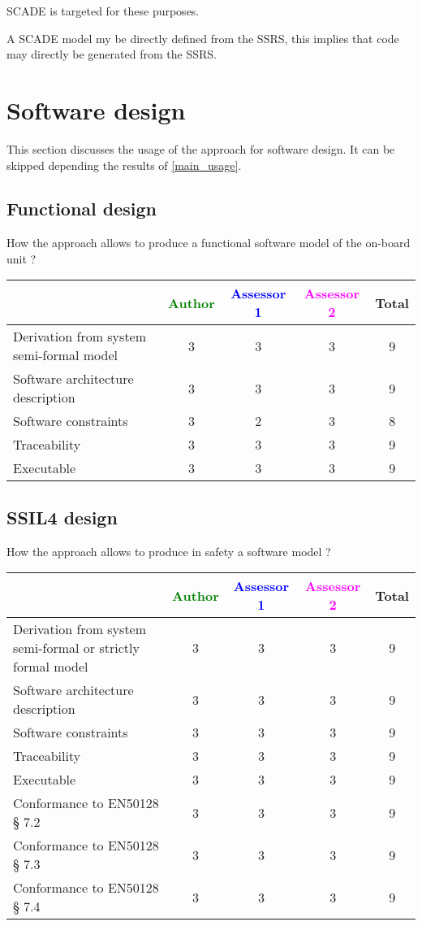\begin{author_comment}
SCADE is targeted for these purposes.   
\end{author_comment}
\begin{assessor2}
A SCADE model my be directly defined from the SSRS, this implies that
code may directly be generated from the SSRS.
\end{assessor2}


\section{Software design}
This section discusses the usage of the approach for software design.
It can be skipped depending the results of \ref{main_usage}.

\subsection{Functional design}

How the approach allows to  produce a functional software model of the on-board unit ?

\begin{tabular}{|l | c | c | c | c|}
\hline
& \textcolor{green}{Author} & \textcolor{blue}{Assessor 1} & \textcolor{magenta}{Assessor 2} & Total \\
\hline
Derivation from system semi-formal model  & 3 & 3 &3 & 9 \\
\hline 
Software architecture description  & 3 & 3 &3 & 9 \\
\hline
Software constraints  & 3 & 2 &3 & 8 \\
\hline
Traceability  & 3 & 3 &3 & 9 \\
\hline
Executable  & 3 & 3 &3 & 9 \\
\hline
\end{tabular}

\subsection{SSIL4 design}

How the approach allows to  produce in safety a software model ?

\begin{tabular}{|l | c | c | c | c|}
\hline
& \textcolor{green}{Author} & \textcolor{blue}{Assessor 1} & \textcolor{magenta}{Assessor 2} & Total \\
\hline
Derivation from system semi-formal or strictly formal model  &
3 & 3 &3 & 9 \\
\hline 
Software architecture description  & 3 & 3 &3 & 9 \\
\hline
Software constraints  & 3 & 3 &3 & 9 \\
\hline
Traceability  & 3 & 3 &3 & 9 \\
\hline
Executable  & 3 & 3 &3 & 9 \\
\hline
Conformance to EN50128 § 7.2  & 3 & 3 &3 & 9 \\
\hline
Conformance to EN50128 § 7.3  & 3 & 3 &3 & 9 \\
\hline
Conformance to EN50128 § 7.4  & 3& 3 &3 & 9 \\
\hline
\end{tabular}

